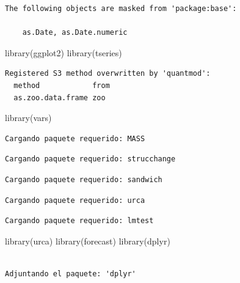 \documentclass[
  spanish,
  letterpaper,
  DIV=11,
  numbers=noendperiod]{scrartcl}
\newenvironment{Shaded}{\begin{snugshade}}{\end{snugshade}}
\newcommand{\FunctionTok}[1]{\textcolor[rgb]{0.28,0.35,0.67}{#1}}
\newcommand{\NormalTok}[1]{\textcolor[rgb]{0.00,0.23,0.31}{#1}}
\begin{document}
\begin{verbatim}
The following objects are masked from 'package:base':

    as.Date, as.Date.numeric
\end{verbatim}

\begin{Shaded}
\begin{Highlighting}[]
\FunctionTok{library}\NormalTok{(ggplot2)}
\FunctionTok{library}\NormalTok{(tseries)}
\end{Highlighting}
\end{Shaded}

\begin{verbatim}
Registered S3 method overwritten by 'quantmod':
  method            from
  as.zoo.data.frame zoo 
\end{verbatim}

\begin{Shaded}
\begin{Highlighting}[]
\FunctionTok{library}\NormalTok{(vars)}
\end{Highlighting}
\end{Shaded}

\begin{verbatim}
Cargando paquete requerido: MASS
\end{verbatim}

\begin{verbatim}
Cargando paquete requerido: strucchange
\end{verbatim}

\begin{verbatim}
Cargando paquete requerido: sandwich
\end{verbatim}

\begin{verbatim}
Cargando paquete requerido: urca
\end{verbatim}

\begin{verbatim}
Cargando paquete requerido: lmtest
\end{verbatim}

\begin{Shaded}
\begin{Highlighting}[]
\FunctionTok{library}\NormalTok{(urca)}
\FunctionTok{library}\NormalTok{(forecast)}
\FunctionTok{library}\NormalTok{(dplyr)}
\end{Highlighting}
\end{Shaded}

\begin{verbatim}

Adjuntando el paquete: 'dplyr'
\end{verbatim}
\end{document}
